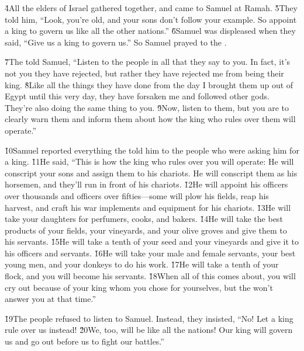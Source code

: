\v{4}All the elders of Israel gathered together, and came to Samuel at Ramah. \v{5}They told him, ``Look, you're old, and your sons don't follow your example. So appoint a king to govern us like all the other nations.'' \v{6}Samuel was displeased when they said, ``Give us a king to govern us.'' So Samuel prayed to the .

\v{7}The  told Samuel, ``Listen to the people in all that they say to you. In fact, it's not you they have rejected, but rather they have rejected me from being their king. \v{8}Like all the things they have done from the day I brought them up out of Egypt until this very day, they have forsaken me and followed other gods. They're also doing the same thing to you. \v{9}Now, listen to them, but you are to clearly warn them and inform them about how the king who rules over them will operate.''

\v{10}Samuel reported everything the  told him to the people who were asking him for a king. \v{11}He said, ``This is how the king who rules over you will operate: He will conscript your sons and assign them to his chariots. He will conscript them as his horsemen, and they'll run in front of his chariots. \v{12}He will appoint his officers over thousands and officers over fifties---some will plow his fields, reap his harvest, and craft his war implements and equipment for his chariots. \v{13}He will take your daughters for perfumers, cooks, and bakers. \v{14}He will take the best products of your fields, your vineyards, and your olive groves and give them to his servants. \v{15}He will take a tenth of your seed and your vineyards and give it to his officers and servants. \v{16}He will take your male and female servants, your best young men, and your donkeys to do his work. \v{17}He will take a tenth of your flock, and you will become his servants. \v{18}When all of this comes about, you will cry out because of your king whom you chose for yourselves, but the  won't answer you at that time.''

\v{19}The people refused to listen to Samuel. Instead, they insisted, ``No! Let a king rule over us instead! \v{20}We, too, will be like all the nations! Our king will govern us and go out before us to fight our battles.''

